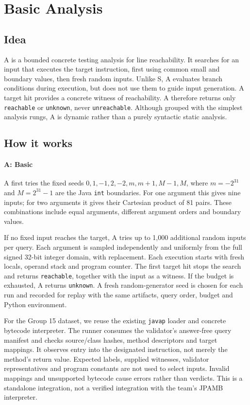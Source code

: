 \section{Basic Analysis}
\label{sec:basic}

\subsection{Idea}
A is a bounded concrete testing analysis for line reachability. It searches
for an input that executes the target instruction, first using common small
and boundary values, then fresh random inputs. Unlike S, A evaluates branch
conditions during execution, but does not use them to guide input generation.
A target hit provides a concrete witness of reachability. A therefore returns
only \texttt{reachable} or \texttt{unknown}, never \texttt{unreachable}.
Although grouped with the simplest analysis rungs, A is dynamic rather than
a purely syntactic static analysis.

\subsection{How it works}
\paragraph{A: Basic}
A first tries the fixed seeds $0,1,-1,2,-2,m,m+1,M-1,M$, where
$m=-2^{31}$ and $M=2^{31}-1$ are the Java \texttt{int} boundaries.
For one argument this gives nine inputs; for two arguments it gives their
Cartesian product of 81 pairs. These combinations include equal arguments,
different argument orders and boundary values.

If no fixed input reaches the target, A tries up to 1,000 additional random
inputs per query. Each argument is sampled independently and uniformly from
the full signed 32-bit integer domain, with replacement. Each execution starts
with fresh locals, operand stack and program counter. The first target hit
stops the search and returns \texttt{reachable}, together with the input as
a witness. If the budget is exhausted, A returns \texttt{unknown}.
A fresh random-generator seed is chosen for each run and recorded for replay
with the same artifacts, query order, budget and Python environment.

For the Group 15 dataset, we reuse the existing \texttt{javap} loader and
concrete bytecode interpreter. The runner consumes the validator's answer-free
query manifest and checks source/class hashes, method descriptors and target
mappings. It observes entry into the designated instruction, not merely the
method's return value. Expected labels, supplied witnesses, validator
representatives and program constants are not used to select inputs.
Invalid mappings and unsupported bytecode cause errors rather than verdicts.
This is a standalone integration, not a verified integration with the team's
JPAMB interpreter.

